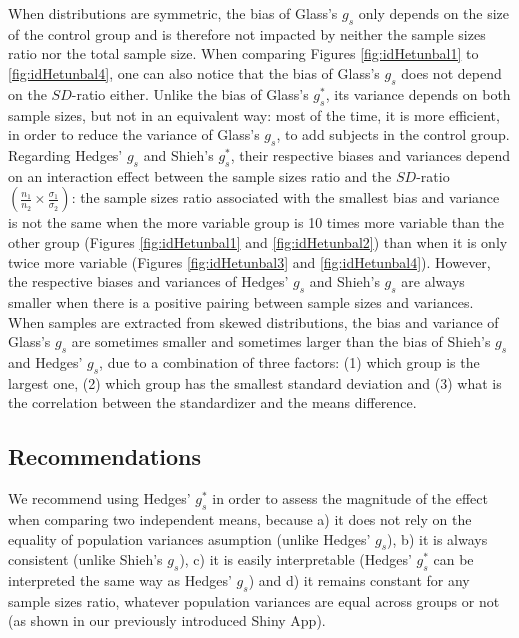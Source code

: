 \documentclass[
  english,
  man,floatsintext]{apa6}
\begin{document}
When distributions are symmetric, the bias of Glass's \(g_s\) only depends on the size of the control group and is therefore not impacted by neither the sample sizes ratio nor the total sample size. When comparing Figures \ref{fig:idHetunbal1} to \ref{fig:idHetunbal4}, one can also notice that the bias of Glass's \(g_s\) does not depend on the \(SD\)-ratio either. Unlike the bias of Glass's \(g^*_s\), its variance depends on both sample sizes, but not in an equivalent way: most of the time, it is more efficient, in order to reduce the variance of Glass's \(g_s\), to add subjects in the control group. Regarding Hedges' \(g_s\) and Shieh's \(g^*_s\), their respective biases and variances depend on an interaction effect between the sample sizes ratio and the \(SD\)-ratio \(\left( \frac{n_1}{n_2} \times \frac{\sigma_1}{\sigma_2} \right)\): the sample sizes ratio associated with the smallest bias and variance is not the same when the more variable group is 10 times more variable than the other group (Figures \ref{fig:idHetunbal1} and \ref{fig:idHetunbal2}) than when it is only twice more variable (Figures \ref{fig:idHetunbal3} and \ref{fig:idHetunbal4}). However, the respective biases and variances of Hedges' \(g_s\) and Shieh's \(g_s\) are always smaller when there is a positive pairing between sample sizes and variances. When samples are extracted from skewed distributions, the bias and variance of Glass's \(g_s\) are sometimes smaller and sometimes larger than the bias of Shieh's \(g_s\) and Hedges' \(g_s\), due to a combination of three factors: (1) which group is the largest one, (2) which group has the smallest standard deviation and (3) what is the correlation between the standardizer and the means difference.

\hypertarget{recommendations}{%
\subsection{Recommendations}\label{recommendations}}

We recommend using Hedges' \(g^*_s\) in order to assess the magnitude of the effect when comparing two independent means, because a) it does not rely on the equality of population variances asumption (unlike Hedges' \(g_s\)), b) it is always consistent (unlike Shieh's \(g_s\)), c) it is easily interpretable (Hedges' \(g^*_s\) can be interpreted the same way as Hedges' \(g_s\)) and d) it remains constant for any sample sizes ratio, whatever population variances are equal across groups or not (as shown in our previously introduced Shiny App).
\end{document}
